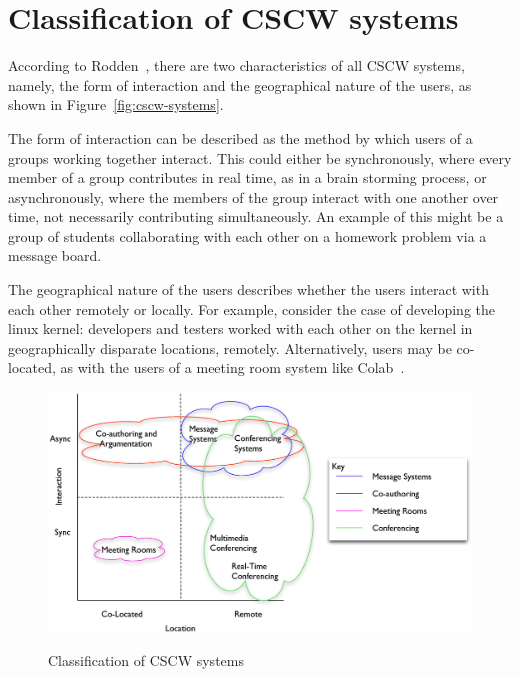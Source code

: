 
\section{Classification of CSCW systems}

According to Rodden~\cite{journals/iwc/Rodden91}, there are two
characteristics of all CSCW systems, namely, the form of interaction
and the geographical nature of the users, as shown in
Figure~\ref{fig:cscw-systems}.

The form of interaction can be described as the method by which users
of a groups working together interact. This could either be
synchronously, where every member of a group contributes in real time,
as in a brain storming process, or asynchronously, where the members
of the group interact with one another over time, not necessarily
contributing simultaneously.  An example of this might be a group of
students collaborating with each other on a homework problem via a
message board.

The geographical nature of the users describes whether the users
interact with each other remotely or locally.  For example, consider
the case of developing the linux kernel: developers and testers worked
with each other on the kernel in geographically disparate locations,
remotely.  Alternatively, users may be co-located, as with the users
of a meeting room system like Colab~\cite{Stefik:1987:BCU}.

\begin{figure}[htp]
  \caption{Classification of CSCW systems\cite{journals/iwc/Rodden91}}
  \label{fig:cscw-systems}
  \centering
  \includegraphics[width=140mm]{CSCWClass.eps}
  \label{CLASS_CSCW}
\end{figure}

